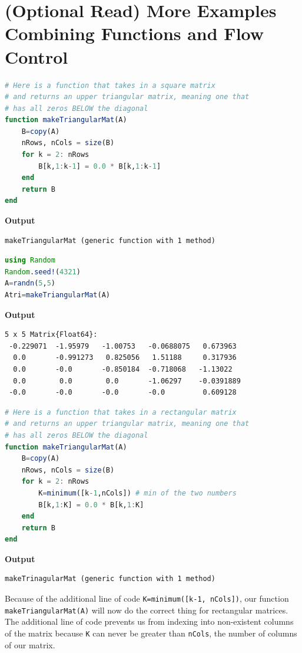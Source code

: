 


\section{(Optional Read) More Examples Combining Functions and Flow Control}



\begin{lstlisting}[language=Julia,style=mystyle]
# Here is a function that takes in a square matrix
# and returns an upper triangular matrix, meaning one that 
# has all zeros BELOW the diagonal
function makeTriangularMat(A)
    B=copy(A)
    nRows, nCols = size(B)
    for k = 2: nRows
        B[k,1:k-1] = 0.0 * B[k,1:k-1]
    end
    return B
end
\end{lstlisting}
\textbf{Output} 
\begin{verbatim}
makeTriangularMat (generic function with 1 method)
\end{verbatim}


\begin{lstlisting}[language=Julia,style=mystyle]
using Random
Random.seed!(4321)
A=randn(5,5)
Atri=makeTriangularMat(A)
\end{lstlisting}

\textbf{Output} 
\begin{verbatim}
5 x 5 Matrix{Float64}:
 -0.229071  -1.95979   -1.00753   -0.0688075   0.673963
  0.0       -0.991273   0.825056   1.51188     0.317936
  0.0       -0.0       -0.850184  -0.718068   -1.13022
  0.0        0.0        0.0       -1.06297    -0.0391889
 -0.0       -0.0       -0.0       -0.0         0.609128
\end{verbatim}


\begin{lstlisting}[language=Julia,style=mystyle]
# Here is a function that takes in a rectangular matrix
# and returns an upper triangular matrix, meaning one that 
# has all zeros BELOW the diagonal
function makeTriangularMat(A)
    B=copy(A)
    nRows, nCols = size(B)
    for k = 2: nRows
        K=minimum([k-1,nCols]) # min of the two numbers
        B[k,1:K] = 0.0 * B[k,1:K]
    end
    return B
end
\end{lstlisting}
\textbf{Output} 
\begin{verbatim}
makeTrinagularMat (generic function with 1 method)
\end{verbatim}


Because of the additional line of code \texttt{K=minimum([k-1, nCols])}, our function \texttt{makeTriangularMat(A)} will now do the correct thing for rectangular matrices. The additional line of code prevents us from indexing into non-existent columns of the matrix because \texttt{K} can never be greater than \texttt{nCols}, the number of columns of our matrix.\\


